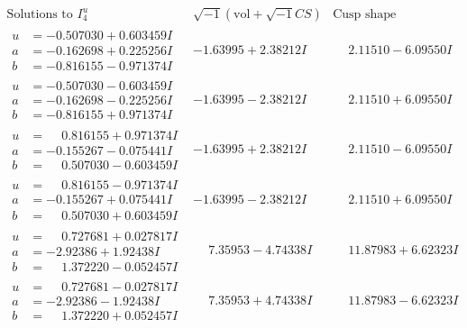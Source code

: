 \documentclass[1p]{elsarticle_modified}
\theoremstyle{definition}
\newcommand{\I}{\sqrt{-1}}
\begin{document}
$$\begin{array}{c|c|c}  
\text{Solutions to }I^u_{4}& \I (\text{vol} + \sqrt{-1}CS) & \text{Cusp shape}\\
 \hline 
\begin{aligned}
u &= -0.507030 + 0.603459 I \\
a &= -0.162698 + 0.225256 I \\
b &= -0.816155 - 0.971374 I\end{aligned}
 & -1.63995 + 2.38212 I & \phantom{-}2.11510 - 6.09550 I \\ \hline\begin{aligned}
u &= -0.507030 - 0.603459 I \\
a &= -0.162698 - 0.225256 I \\
b &= -0.816155 + 0.971374 I\end{aligned}
 & -1.63995 - 2.38212 I & \phantom{-}2.11510 + 6.09550 I \\ \hline\begin{aligned}
u &= \phantom{-}0.816155 + 0.971374 I \\
a &= -0.155267 - 0.075441 I \\
b &= \phantom{-}0.507030 - 0.603459 I\end{aligned}
 & -1.63995 + 2.38212 I & \phantom{-}2.11510 - 6.09550 I \\ \hline\begin{aligned}
u &= \phantom{-}0.816155 - 0.971374 I \\
a &= -0.155267 + 0.075441 I \\
b &= \phantom{-}0.507030 + 0.603459 I\end{aligned}
 & -1.63995 - 2.38212 I & \phantom{-}2.11510 + 6.09550 I \\ \hline\begin{aligned}
u &= \phantom{-}0.727681 + 0.027817 I \\
a &= -2.92386 + 1.92438 I \\
b &= \phantom{-}1.372220 - 0.052457 I\end{aligned}
 & \phantom{-}7.35953 - 4.74338 I & \phantom{-}11.87983 + 6.62323 I \\ \hline\begin{aligned}
u &= \phantom{-}0.727681 - 0.027817 I \\
a &= -2.92386 - 1.92438 I \\
b &= \phantom{-}1.372220 + 0.052457 I\end{aligned}
 & \phantom{-}7.35953 + 4.74338 I & \phantom{-}11.87983 - 6.62323 I \\ \hline\begin{aligned}

\end{aligned}
\end{array}$$
\end{document}
